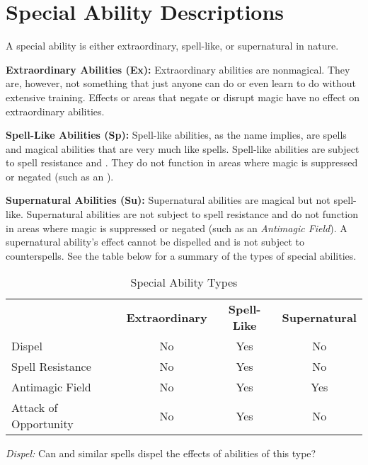 \section{Special Ability Descriptions}

A special ability is either extraordinary, spell-like, or supernatural in nature.

\textbf{Extraordinary Abilities (Ex):} Extraordinary abilities are nonmagical. 
They are, however, not something that just anyone can do or even learn to do without 
extensive training. Effects or areas that negate or disrupt magic have no effect 
on extraordinary abilities.

\textbf{Spell-Like Abilities (Sp):} Spell-like abilities, as the name implies, 
are spells and magical abilities that are very much like spells. Spell-like abilities 
are subject to spell resistance and . They do not function 
in areas where magic is suppressed or negated (such as an ).

\textbf{Supernatural Abilities (Su):} Supernatural abilities are magical but not 
spell-like. Supernatural abilities are not subject to spell resistance and do not 
function in areas where magic is suppressed or negated (such as an \textit{Antimagic Field}).
A supernatural ability's effect cannot be dispelled and is not subject 
to counterspells. See the table below for a summary of the types of special abilities.

\begin{table}[htb]
\mcinherit
\caption{Special Ability Types}
\centering
\begin{tabular}{l c c c}
 & \textbf{Extraordinary} & \textbf{Spell-Like} & \textbf{Supernatural}\\
Dispel & No & Yes & No\\
Spell Resistance & No & Yes & No\\
Antimagic Field & No & Yes & Yes\\
Attack of Opportunity & No & Yes & No\\
\end{tabular}
\end{table}

\textit{Dispel:} Can  and similar spells dispel the effects of abilities of this type?


